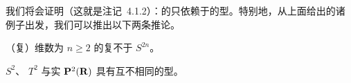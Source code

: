 我们将会证明（这就是注记~4.1.2）：\trComplex{}的\trHomology{}只依赖于\trManifold{}的\trDiffeomorphism{}型。特别地，从上面给出的诸例子出发，我们可以推出以下两条推论。

\begin{corollary}\label{thm:complex-projective-not-sphere}
（复）维数为 $n\ge 2$ 的复\trProjectiveSpace{}不\trDiffeomorphic{}于\trSphere{} $S^{2n}$。
\end{corollary}

\begin{corollary}\label{thm:sphere-torus-plane-distinct}
\trSphere{} $S^2$、\trTorus{} $T^2$ 与实\trProjectivePlane{} $\mathbf{P}^2(\mathbf{R})$ 具有互不相同的\trDiffeomorphism{}型。
\end{corollary}
